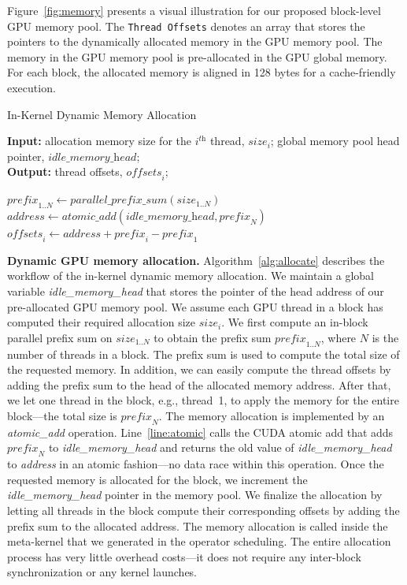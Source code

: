 \documentclass[conference]{IEEEtran}
\begin{document}
Figure~\ref{fig:memory} presents a visual illustration for our proposed block-level GPU memory pool. 
The \texttt{Thread Offsets} denotes an array that stores the pointers to the dynamically allocated memory in the GPU memory pool. The memory in the GPU memory pool is pre-allocated in the GPU global memory. For each block, the allocated memory is aligned in 128 bytes for a cache-friendly execution.

\begin{algorithm}
\caption{In-Kernel Dynamic Memory Allocation}\label{alg:allocate}
\textbf{Input:} allocation memory size for the $i^\textit{th}$ thread, $\textit{size}_i$; global memory pool head pointer, $\textit{idle\_memory\_head}$;\\
\textbf{Output:} thread offsets, $\textit{offsets}_i$;
\begin{algorithmic}[1]
\STATE $\textit{prefix}_{1..N} \leftarrow \textit{parallel\_prefix\_sum}(\textit{size}_{1..N})$
\STATE $\textit{address} \leftarrow \textit{atomic\_add}(\textit{idle\_memory\_head},\textit{prefix}_N)$\label{line:atomic}
    \STATE $\textit{offsets}_i \leftarrow \textit{address} + \textit{prefix}_i- \textit{prefix}_1$
\ENDFOR
\end{algorithmic}
\end{algorithm}

\textbf{Dynamic GPU memory allocation.} Algorithm~\ref{alg:allocate} describes the workflow of the in-kernel dynamic memory allocation. We maintain a global variable \textit{idle\_memory\_head} that stores the pointer of the head address of our pre-allocated GPU memory pool. We assume each GPU thread in a block has computed their required allocation size $\textit{size}_i$. We first compute an in-block parallel prefix sum on $\textit{size}_{1..N}$ to obtain the prefix sum $\textit{prefix}_{1..N}$, where $N$ is the number of threads in a block. 
The prefix sum is used to compute the total size of the requested memory. In addition, we can easily compute the thread offsets by adding the prefix sum to the head of the allocated memory address. 
After that, we let one thread in the block, e.g., thread~1, to apply the memory for the entire block---the total size is $\textit{prefix}_N$. 
The memory allocation is implemented by an \textit{atomic\_add} operation. Line~\ref{line:atomic} calls the CUDA atomic add that adds $\textit{prefix}_N$ to \textit{idle\_memory\_head} and returns the old value of \textit{idle\_memory\_head} to \textit{address} in an atomic fashion---no data race within this operation. 
Once the requested memory is allocated for the block, we increment the \textit{idle\_memory\_head} pointer in the memory pool. 
We finalize the allocation by letting all threads in the block compute their corresponding offsets by adding the prefix sum to the allocated address. 
The memory allocation is called inside the meta-kernel that we generated in the operator scheduling. 
The entire allocation process has very little overhead costs---it does not require any inter-block synchronization or any kernel launches. 
\end{document}
